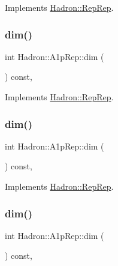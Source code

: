 Implements \mbox{\hyperlink{structHadron_1_1RepRep_a92c8802e5ed7afd7da43ccfd5b7cd92b}{Hadron\+::\+Rep\+Rep}}.

\mbox{\label{structHadron_1_1A1pRep_a79006cfd063396120fffa57b1280949e}} 
\subsubsection{\texorpdfstring{dim()}{dim()}\hspace{0.1cm}{\footnotesize\ttfamily [3/5]}}
{\footnotesize\ttfamily int Hadron\+::\+A1p\+Rep\+::dim (\begin{DoxyParamCaption}{ }\end{DoxyParamCaption}) const\hspace{0.3cm}{\ttfamily [inline]}, {\ttfamily [virtual]}}



Implements \mbox{\hyperlink{structHadron_1_1RepRep_a92c8802e5ed7afd7da43ccfd5b7cd92b}{Hadron\+::\+Rep\+Rep}}.

\mbox{\label{structHadron_1_1A1pRep_a79006cfd063396120fffa57b1280949e}} 
\subsubsection{\texorpdfstring{dim()}{dim()}\hspace{0.1cm}{\footnotesize\ttfamily [4/5]}}
{\footnotesize\ttfamily int Hadron\+::\+A1p\+Rep\+::dim (\begin{DoxyParamCaption}{ }\end{DoxyParamCaption}) const\hspace{0.3cm}{\ttfamily [inline]}, {\ttfamily [virtual]}}



Implements \mbox{\hyperlink{structHadron_1_1RepRep_a92c8802e5ed7afd7da43ccfd5b7cd92b}{Hadron\+::\+Rep\+Rep}}.

\mbox{\label{structHadron_1_1A1pRep_a79006cfd063396120fffa57b1280949e}} 
\subsubsection{\texorpdfstring{dim()}{dim()}\hspace{0.1cm}{\footnotesize\ttfamily [5/5]}}
{\footnotesize\ttfamily int Hadron\+::\+A1p\+Rep\+::dim (\begin{DoxyParamCaption}{ }\end{DoxyParamCaption}) const\hspace{0.3cm}{\ttfamily [inline]}, {\ttfamily [virtual]}}



